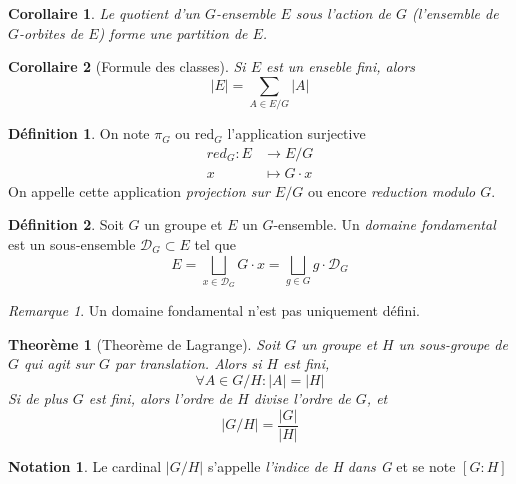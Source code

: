 \documentclass[french]{article}
\theoremstyle{plain}
\newtheorem{thm}{Theorème}[section]
\newtheorem{cor}{Corollaire}[thm]
\theoremstyle{remark}
\newtheorem*{rmq}{Remarque}
\theoremstyle{definition}
\newtheorem{defn}{Définition}[section]
\newtheorem*{notn}{Notation}
\newcommand{\red}{\mathrm{red}}
\begin{document}
\begin{cor}
	Le quotient d'un $G$-ensemble $E$ sous l'action de $G$ (l'ensemble de $G$-orbites de $E$)
	forme une partition de $E$.
\end{cor}

\begin{cor}[Formule des classes]
	Si $E$ est un enseble fini, alors
	\begin{equation*}
		|E| = \sum_{A \in E/G}|A|
	\end{equation*}
\end{cor}

\begin{defn}
	On note $\pi_G$ ou $\red_G$ l'application surjective
	\begin{align*}
		red_G : E &\to E/G \\
		x &\mapsto G \cdot x
	\end{align*}
	On appelle cette application \emph{projection sur $E/G$} ou encore
	\emph{reduction modulo $G$}.
\end{defn}

\begin{defn}
	Soit $G$ un groupe et $E$ un $G$-ensemble.
	Un \emph{domaine fondamental} est un sous-ensemble
	$\mathcal{D}_G \subset E$ tel que
	\begin{equation*}
		E = \bigsqcup_{x \in \mathcal{D}_G} G \cdot x
			= \bigsqcup_{g \in G} g \cdot \mathcal{D}_G
	\end{equation*}
\end{defn}

\begin{rmq}
	Un domaine fondamental n'est pas uniquement défini.
\end{rmq}


\begin{thm}[Theorème de Lagrange]
	Soit $G$ un groupe et $H$ un sous-groupe de $G$
	qui agit sur $G$ par translation. Alors si $H$ est fini,
	\begin{equation*}
		\forall A \in G/H: |A| = |H|
	\end{equation*}
	Si de plus $G$ est fini, alors l'ordre de $H$ divise l'ordre de $G$,
	et 
	\begin{equation*}
		|G/H| = \frac{|G|}{|H|}
	\end{equation*}
\end{thm}

\begin{notn}
	Le cardinal $|G/H|$ s'appelle \emph{l'indice de H dans G} et se note
	$[G : H]$
\end{notn}
\end{document}
